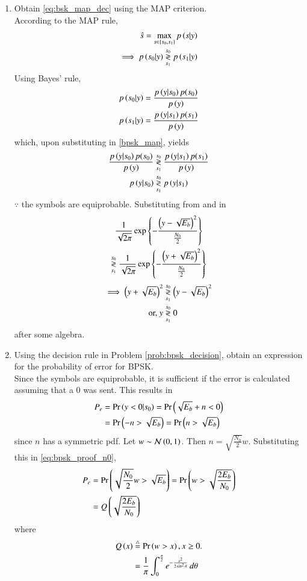 \documentclass[journal,12pt,twocolumn]{IEEEtran}
\renewcommand\thesection{\arabic{section}}
\begin{document}
\begin{enumerate}[label=\thesection.\arabic*.,ref=\thesection.\theenumi]
\item Obtain \eqref{eq:bsk_map_dec} using the MAP criterion.
\\
\solution According to the MAP rule, 
\begin{align}
\hat{s} = \max_{s \in \left\{s_0,s_1\right\}} p\left(s|y\right)
\\
\implies  p\left(s_0|y\right) \overset{s_0}{\underset{s_1}{\gtrless}}  p\left(s_1|y\right)
\label{bpsk_map}
\end{align}
%
Using Bayes' rule, 
\begin{align}
 p\left(s_0|y\right) &= \frac{p\left(y|s_0\right)p(s_0)}{p\left(y\right)}
\\
 p\left(s_1|y\right) &= \frac{p\left(y|s_1\right)p(s_1)}{p\left(y\right)}
\end{align}
%
which, upon substituting in \eqref{bpsk_map}, yields
\begin{align}
\frac{p\left(y|s_0\right)p(s_0)}{p\left(y\right)} &\overset{s_0}{\underset{s_1}{\gtrless}} \frac{p\left(y|s_1\right)p(s_1)}{p\left(y\right)}
\\
p\left(y|s_0\right)&\overset{s_0}{\underset{s_1}{\gtrless}} p\left(y|s_1\right)
\label{bpsk_map_temp}
\end{align}
%
$\because$ the symbols are equiprobable. Substituting from \label{eq:bpsk_y0pdf} and \label{eq:bpsk_y1pdf} in \label{bpsk_map_temp} 
%
\begin{multline}
\frac{1}{\sqrt{2\pi}}\exp\left\{-\frac{\left(y - \sqrt{E_b}\right)^2}{\frac{N_0}{2}}\right\} 
\\
\overset{s_0}{\underset{s_1}{\gtrless}} \frac{1}{\sqrt{2\pi}}\exp\left\{-\frac{\left(y + \sqrt{E_b}\right)^2}{\frac{N_0}{2}}\right\}
\end{multline}
\begin{align}
\implies \left(y + \sqrt{E_b}\right)^2 &\overset{s_0}{\underset{s_1}{\gtrless}} \left(y - \sqrt{E_b}\right)^2
\\
\text{or, } y &\overset{s_0}{\underset{s_1}{\gtrless}} 0
\end{align}
%
after some algebra.
%
\item
Using the decision rule in Problem \ref{prob:bpsk_decision}, obtain an expression for the probability of error for BPSK.
\\
\solution
Since the symbols are equiprobable, it is sufficient if the error is calculated assuming that a 0 was sent.  This results in
\begin{align}
P_e &= \Pr\left(y < 0|s_0\right) = \Pr\left(\sqrt{E_b} + n < 0\right)
\\
&= \Pr\left( -n > \sqrt{E_b} \right) = \Pr\left( n > \sqrt{E_b} \right)
\label{eq:bpsk_proof_n0}
\end{align}
since $n$ has a symmetric pdf.
Let $w \sim \mathcal{N}\left(0,1\right)$.  Then $n = \sqrt{\frac{N_0}{2}}w$. Substituting this in \eqref{eq:bpsk_proof_n0},
\begin{align}
P_e &=  \Pr\left( \sqrt{\frac{N_0}{2}}w > \sqrt{E_b} \right) = \Pr\left( w > \sqrt{\frac{2E_b}{N_0}} \right)
\\
&= Q\left(\sqrt{\frac{2E_b}{N_0}}\right)
\end{align}
%
where 
\begin{align}
\label{eq:qfunc_def}
Q\left(x\right) &\stackrel{\triangle}{=} \Pr\left(w > x\right), x \ge 0 .
\\
&= \frac{1}{\pi}\int^{\frac{\pi}{2}}_{0}e^{-\frac{x^2}{2\sin^2 \theta}}\,d\theta
\end{align}


\end{enumerate}
\end{document}
